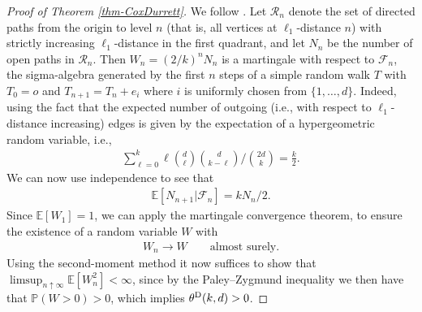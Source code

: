 \documentclass[a4paper, oneside, 11pt]{amsart}
\theoremstyle{definition}
\renewcommand{\P}{\mathbb{P}}
\newcommand{\1}{\mathbbm{1}}
\newcommand{\E}{\mathbb{E}}
\newcommand{\0}{\mathbf{o}}
\numberwithin{equation}{section}
\begin{document}
\begin{proof}[Proof of Theorem \ref{thm-CoxDurrett}]
We follow \cite[Section 2]{CoxDurrett}. Let $\mathcal R_n$ denote the set of directed paths from the origin to level $n$ (that is, all vertices at $\ell_1$-distance $n$) with strictly increasing $\ell_1$-distance in the first quadrant, and let $N_n$ be the number of open paths in $\mathcal R_n$. Then $W_n=(2/k)^nN_n$ is a martingale with respect to $\mathcal F_n$, the sigma-algebra generated by the first $n$ steps of a simple random walk $T$ with $T_0=o$ and $T_{n+1}=T_n+e_i$ where $i$ is uniformly chosen from $\{1,\dots ,d\}$. Indeed, using the fact that the expected number of outgoing (i.e., with respect to $\ell_1$-distance increasing) edges  is given by the expectation of a hypergeometric random variable, i.e., 
\begin{align*}
\sum_{\ell=0}^k \ell\binom{d}{\ell}\binom{d}{k-\ell}\Big/\binom{2d}{k}=\frac{k}{2}.
\end{align*}
We can now use independence to see that 
\begin{align*}
\E[N_{n+1}|\mathcal F_n]=kN_n/2.
\end{align*}
Since $\E[W_1]=1$, we can apply the martingale convergence theorem, to ensure the existence of a random variable $W$ with 
\begin{align*}
W_n\to W\qquad \text{almost surely}.
\end{align*}
Using the second-moment method it now suffices to show that $\limsup_{n\uparrow\infty}\E[W_n^2]<\infty$, since by the Paley--Zygmund inequality we then have that $\P(W>0)>0$, which implies $\theta^{\rm D}(k,d)>0$.


\end{proof}
\end{document}
